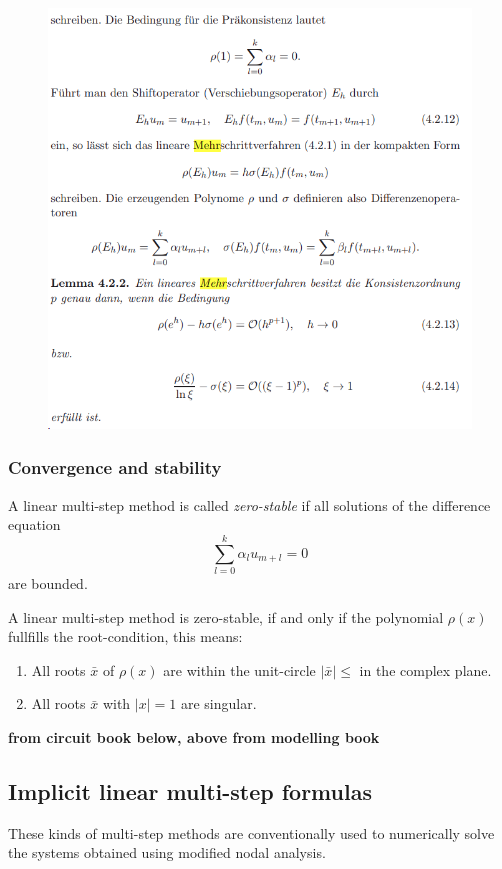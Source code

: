 \begin{figure}[H]
	\centering
	\includegraphics[width=0.7\linewidth]{screenshot014}
	\caption{}
	\label{fig:screenshot014}
\end{figure}



\subsubsection{Convergence and stability}

\begin{definition}
	A linear multi-step method is called \emph{zero-stable} if all solutions of the difference equation
	\begin{displaymath}
		\sum_{l=0}^{k} \alpha_l u_{m+l} = 0
	\end{displaymath}
	are bounded.
\end{definition}

\begin{theorem}
	A linear multi-step method is zero-stable, if and only if the polynomial $\rho(x)$ fullfills the root-condition, this means:
	\begin{enumerate}
		\item All roots $\bar{x}$ of $\rho(x)$ are within the unit-circle $|\bar{x}| \leq$ in the complex plane.
		\item All roots $\bar{x}$ with $|x| = 1$ are singular.
	\end{enumerate}
\end{theorem}


\textbf{from circuit book below, above from modelling book}

\subsection{Implicit linear multi-step formulas}
These kinds of multi-step methods are conventionally used to numerically solve the systems obtained using modified nodal analysis. 

